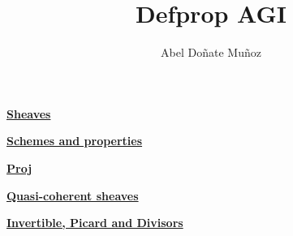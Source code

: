 \documentclass[9pt,leqno,landscape,twocolumn]{extarticle}
\title{Defprop AGI}
\author{Abel Doñate Muñoz}
\date{}
\begin{document}

\textbf{\underline{Sheaves}}



\textbf{\underline{Schemes and properties}}



\textbf{\underline{Proj}}




\textbf{\underline{Quasi-coherent sheaves}}



\textbf{\underline{Invertible, Picard and Divisors}}


\end{document}
